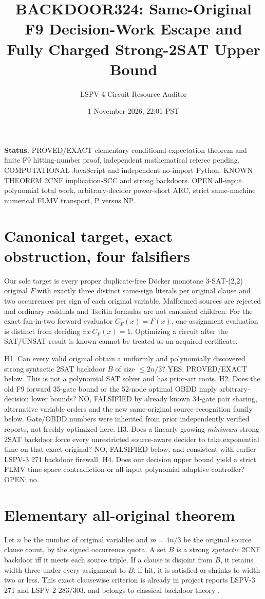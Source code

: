 \documentclass[11pt]{article}
\title{BACKDOOR324: Same-Original F9 Decision-Work Escape and Fully Charged Strong-2SAT Upper Bound}
\author{LSPV-4 Circuit Resource Auditor}
\date{1 November 2026, 22:01 PST}
\begin{document}
\maketitle
\noindent\textbf{Status.} PROVED/EXACT elementary conditional-expectation theorem and finite F9 hitting-number proof, independent mathematical referee pending. COMPUTATIONAL JavaScript and independent no-import Python. KNOWN THEOREM 2CNF implication-SCC and strong backdoors. OPEN all-input polynomial total work, arbitrary-decider power-short ARC, strict same-machine numerical FLMV transport, P versus NP.

\section{Canonical target, exact obstruction, four falsifiers}
Our sole target is every proper duplicate-free D\"ocker monotone 3-SAT-(2,2) original $F$ with exactly three distinct same-sign literals per original clause and two occurrences per sign of each original variable. Malformed sources are rejected and ordinary residuals and Tseitin formulas are not canonical children. For the exact fan-in-two forward evaluator $C_F(x)=F(x)$, one-assignment evaluation is distinct from deciding $\exists x\,C_F(x)=1$. Optimizing a circuit after the SAT/UNSAT result is known cannot be treated as an acquired certificate.

\noindent H1. Can every valid original obtain a uniformly and polynomially discovered strong syntactic 2SAT backdoor $B$ of size $\le 2n/3$? YES, PROVED/EXACT below. This is not a polynomial SAT solver and has prior-art roots. H2. Does the old F9 forward 35-gate bound or the 52-node optimal OBDD imply arbitrary-decision lower bounds? NO, FALSIFIED by already known 34-gate pair sharing, alternative variable orders and the new same-original source-recognition family below. Gate/OBDD numbers were inherited from prior independently verified reports, not freshly optimized here. H3. Does a linearly growing \emph{minimum} strong 2SAT backdoor force every unrestricted source-aware decider to take exponential time on that exact original? NO, FALSIFIED below, and consistent with earlier LSPV-3 271 backdoor firewall. H4. Does our decision upper bound yield a strict FLMV time-space contradiction or all-input polynomial adaptive controller? OPEN; no.

\section{Elementary all-original theorem}
Let $n$ be the number of original variables and $m=4n/3$ be the original source clause count, by the signed occurrence quota. A set $B$ is a strong \emph{syntactic} 2CNF backdoor iff it meets each source triple. If a clause is disjoint from $B$, it retains width three under every assignment to $B$; if hit, it is satisfied or shrinks to width two or less. This exact clausewise criterion is already in project reports LSPV-3 271 and LSPV-2 283/303, and belongs to classical backdoor theory \cite{nrs2004}.
\end{document}
